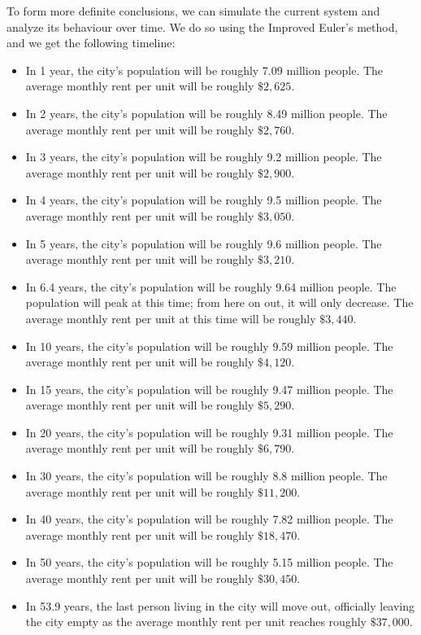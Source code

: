 \documentclass{article}
\begin{document}
To form more definite conclusions, we can simulate the current system and analyze its behaviour over
time. We do so using the Improved Euler's method, and we get the following timeline:

\begin{itemize}
    \item In 1 year, the city's population will be roughly 7.09 million people. The average monthly
        rent per unit will be roughly $ \$2,625 $.
    \item In 2 years, the city's population will be roughly 8.49 million people. The average monthly
        rent per unit will be roughly $ \$2,760 $.
    \item In 3 years, the city's population will be roughly 9.2 million people. The average monthly
        rent per unit will be roughly $ \$2,900 $.
    \item In 4 years, the city's population will be roughly 9.5 million people. The average monthly
        rent per unit will be roughly $ \$3,050 $.
    \item In 5 years, the city's population will be roughly 9.6 million people. The average monthly
        rent per unit will be roughly $ \$3,210 $.
    \item In 6.4 years, the city's population will be roughly 9.64 million people.
        The population will peak at this time; from here on out, it will only decrease.
        The average monthly rent per unit at this time will be roughly $ \$3,440 $.
    \item In 10 years, the city's population will be roughly 9.59 million people.
        The average monthly rent per unit will be roughly $ \$4,120 $.
    \item In 15 years, the city's population will be roughly 9.47 million people.
        The average monthly rent per unit will be roughly $ \$5,290 $.
    \item In 20 years, the city's population will be roughly 9.31 million people.
        The average monthly rent per unit will be roughly $ \$6,790 $.
    \item In 30 years, the city's population will be roughly 8.8 million people. The average monthly
        rent per unit will be roughly $ \$11,200 $.
    \item In 40 years, the city's population will be roughly 7.82 million people.
        The average monthly rent per unit will be roughly $ \$18,470 $.
    \item In 50 years, the city's population will be roughly 5.15 million people.
        The average monthly rent per unit will be roughly $ \$30,450 $.
    \item In 53.9 years, the last person living in the city will move out, officially leaving the
        city empty as the average monthly rent per unit reaches roughly $ \$37,000 $.
\end{itemize}
\end{document}
